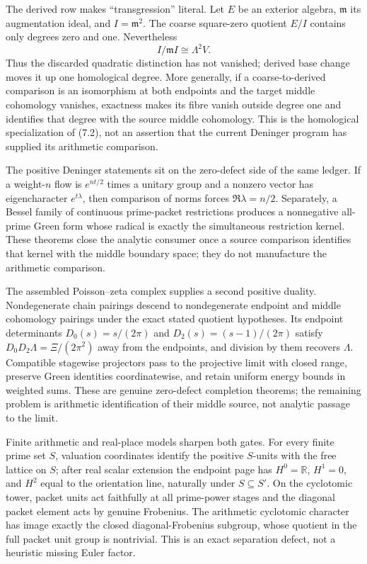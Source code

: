 \documentclass[11pt]{article}
\theoremstyle{definition}
\theoremstyle{remark}
\newcommand{\R}{\mathbb R}
\begin{document}
The derived row makes ``transgression'' literal.  Let $E$ be an exterior algebra,
$\mathfrak m$ its augmentation ideal, and $I=\mathfrak m^2$.  The coarse square-zero quotient
$E/I$ contains only degrees zero and one.  Nevertheless
\[
 I/\mathfrak mI\cong\Lambda^2V.
 \tag{7.3}
\]
Thus the discarded quadratic distinction has not vanished; derived base change moves it up one
homological degree.  More generally, if a coarse-to-derived comparison is an isomorphism at both
endpoints and the target middle cohomology vanishes, exactness makes its fibre vanish outside
degree one and identifies that degree with the source middle cohomology.  This is the homological
specialization of (7.2), not an assertion that the current Deninger program has supplied its
arithmetic comparison.

The positive Deninger statements sit on the zero-defect side of the same ledger.  If a weight-$n$
flow is $e^{nt/2}$ times a unitary group and a nonzero vector has eigencharacter $e^{t\lambda}$,
then comparison of norms forces $\Re\lambda=n/2$.  Separately, a Bessel family of continuous
prime-packet restrictions produces a nonnegative all-prime Green form whose radical is exactly
the simultaneous restriction kernel.  These theorems close the analytic consumer once a source
comparison identifies that kernel with the middle boundary space; they do not manufacture the
arithmetic comparison.

The assembled Poisson--zeta complex supplies a second positive duality.  Nondegenerate chain
pairings descend to nondegenerate endpoint and middle cohomology pairings under the exact stated
quotient hypotheses.  Its endpoint determinants
$D_0(s)=s/(2\pi)$ and $D_2(s)=(s-1)/(2\pi)$ satisfy
$D_0D_2\Lambda=\Xi/(2\pi^2)$ away from the endpoints, and division by them recovers $\Lambda$.
Compatible stagewise projectors pass to the projective limit with closed range, preserve Green
identities coordinatewise, and retain uniform energy bounds in weighted sums.  These are genuine
zero-defect completion theorems; the remaining problem is arithmetic identification of their
middle source, not analytic passage to the limit.

Finite arithmetic and real-place models sharpen both gates.  For every finite prime set $S$,
valuation coordinates identify the positive $S$-units with the free lattice on $S$; after real
scalar extension the endpoint page has $H^0=\R$, $H^1=0$, and $H^2$ equal to the orientation
line, naturally under $S\subseteq S'$.  On the cyclotomic tower, packet units act faithfully at all
prime-power stages and the diagonal packet element acts by genuine Frobenius.  The arithmetic
cyclotomic character has image exactly the closed diagonal-Frobenius subgroup, whose quotient in
the full packet unit group is nontrivial.  This is an exact separation defect, not a heuristic
missing Euler factor.
\end{document}
